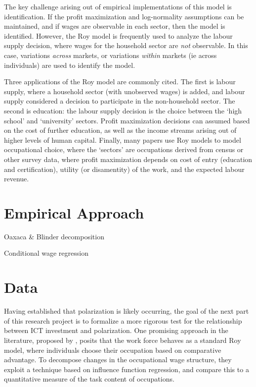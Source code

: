 \message{ !name(paper.tex)}\documentclass[a4paper,11pt]{report}
\numberwithin{equation}{chapter}
\begin{document}
The key challenge arising out of empirical implementations of this model is identification. If the profit maximization and log-normality assumptions can be maintained, and if wages are observable in each sector, then the model is identified. However, the Roy model is frequently used to analyze the labour supply decision, where wages for the household sector are {\em not} observable. In this case, variations {\em across } markets, or variations {\em within } markets (ie across individuals) are used to identify the model.

Three applications of the Roy model are commonly cited. The first is labour supply, where a household sector (with unobserved wages) is added, and labour supply considered a decision to participate in the non-household sector. The second is education: the labour supply decision is the choice between the `high school' and `university' sectors. Profit maximization decisions can assumed based on the cost of further education, as well as the income streams arising out of higher levels of human capital. Finally, many papers use Roy models to model occupational choice, where the `sectors' are occupations derived from census or other survey data, where profit maximization depends on cost of entry (education and certification), utility (or disamentity) of the work, and the expected labour revenue.


\section{Empirical Approach}

Oaxaca \& Blinder decomposition

Conditional wage regression

\section{Data}

Having established that polarization is likely occurring, the goal of the next part of this research project is to formalize a more rigorous test for the relationship between ICT investment and polarization. One promising approach in the literature, proposed by \citet{Firpo2011}, posits that the work force behaves as a standard Roy model, where individuals choose their occupation based on comparative advantage. To decompose changes in the occupational wage structure, they exploit a technique based on influence function regression, and compare this to a quantitative measure of the task content of occupations.
\end{document}
